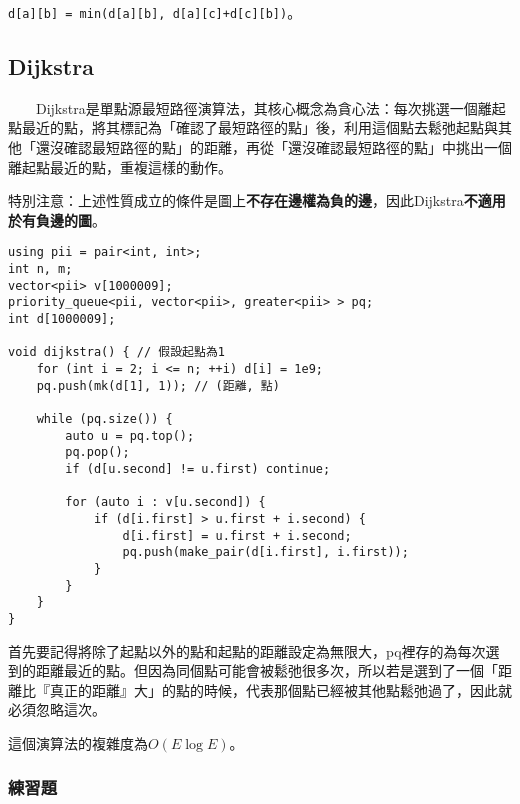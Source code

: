\begin{center}
    \lstinline{d[a][b] = min(d[a][b], d[a][c]+d[c][b])}。
\end{center}

\subsection{Dijkstra}

　　Dijkstra是單點源最短路徑演算法，其核心概念為貪心法：每次挑選一個離起點最近的點，將其標記為「確認了最短路徑的點」後，利用這個點去鬆弛起點與其他「還沒確認最短路徑的點」的距離，再從「還沒確認最短路徑的點」中挑出一個離起點最近的點，重複這樣的動作。

特別注意：上述性質成立的條件是圖上\textbf{不存在邊權為負的邊}，因此Dijkstra\textbf{不適用於有負邊的圖}。

\begin{lstlisting}[caption=Dijkstra演算法]
using pii = pair<int, int>;
int n, m;
vector<pii> v[1000009];
priority_queue<pii, vector<pii>, greater<pii> > pq;
int d[1000009];

void dijkstra() { // 假設起點為1
	for (int i = 2; i <= n; ++i) d[i] = 1e9;
	pq.push(mk(d[1], 1)); // (距離, 點)
	
	while (pq.size()) {
		auto u = pq.top();
		pq.pop();
		if (d[u.second] != u.first) continue;
		
		for (auto i : v[u.second]) {
			if (d[i.first] > u.first + i.second) {
				d[i.first] = u.first + i.second;
				pq.push(make_pair(d[i.first], i.first));
			}
		}
	}
}
\end{lstlisting}

首先要記得將除了起點以外的點和起點的距離設定為無限大，pq裡存的為每次選到的距離最近的點。但因為同個點可能會被鬆弛很多次，所以若是選到了一個「距離比『真正的距離』大」的點的時候，代表那個點已經被其他點鬆弛過了，因此就必須忽略這次。

這個演算法的複雜度為$O(E\log E)$。

\subsubsection{練習題}



